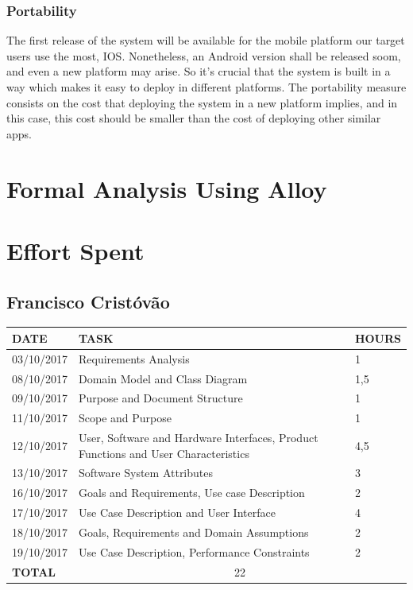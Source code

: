 \documentclass[12pt]{article}
\begin{document}
\subsubsection{Portability}
The first release of the system will be available for the mobile platform our target users use the most, IOS. Nonetheless, an Android version shall be released soom, and even a new platform may arise. So it's crucial that the system is built in a way which makes it easy to deploy in different platforms. The portability measure consists on the cost that deploying the system in a new platform implies, and in this case, this cost should be smaller than the cost of deploying other similar apps.

\section{Formal Analysis Using Alloy}

\section{Effort Spent}
\subsection{Francisco Cristóvão}

\begin{center}
\begin{tabular}{ |p{}|p{}|p{}| } 
 \hline
 \textbf{DATE} & \textbf{TASK} & \textbf{HOURS} \\ 
  \hline
 03/10/2017 & Requirements Analysis & 1 \\ 
  \hline
 08/10/2017 & Domain Model and Class Diagram & 1,5 \\ 
  \hline
  09/10/2017 & Purpose and Document Structure & 1 \\ 
  \hline
  11/10/2017 & Scope and Purpose & 1 \\ 
  \hline
  12/10/2017 & User, Software and Hardware Interfaces, Product Functions and User Characteristics & 4,5 \\ 
  \hline
  13/10/2017 & Software System Attributes & 3 \\ 
  \hline
  16/10/2017 & Goals and Requirements, Use case Description & 2 \\ 
  \hline
  17/10/2017 & Use Case Description and User Interface & 4 \\ 
  \hline
  18/10/2017 & Goals, Requirements and Domain Assumptions & 2 \\ 
  \hline
  19/10/2017 & Use Case Description, Performance Constraints & 2 \\ 
  \hline
  \textbf{TOTAL} & \multicolumn{2}{c|}{22} \\ 
  \hline
\end{tabular}
\end{center}
\end{document}
